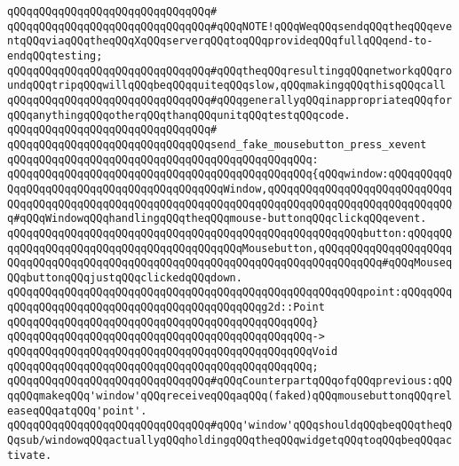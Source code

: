 \verb|qQQqqQQqqQQqqQQqqQQqqQQqqQQqqQQq#|\newline
\verb|qQQqqQQqqQQqqQQqqQQqqQQqqQQqqQQq#qQQqNOTE!qQQqWeqQQqsendqQQqtheqQQqeventqQQqviaqQQqtheqQQqXqQQqserverqQQqtoqQQqprovideqQQqfullqQQqend-to-endqQQqtesting;|\newline
\verb|qQQqqQQqqQQqqQQqqQQqqQQqqQQqqQQq#qQQqtheqQQqresultingqQQqnetworkqQQqroundqQQqtripqQQqwillqQQqbeqQQqquiteqQQqslow,qQQqmakingqQQqthisqQQqcall|\newline
\verb|qQQqqQQqqQQqqQQqqQQqqQQqqQQqqQQq#qQQqgenerallyqQQqinappropriateqQQqforqQQqanythingqQQqotherqQQqthanqQQqunitqQQqtestqQQqcode.|\newline
\verb|qQQqqQQqqQQqqQQqqQQqqQQqqQQqqQQq#|\newline
\verb|qQQqqQQqqQQqqQQqqQQqqQQqqQQqqQQqsend_fake_mousebutton_press_xevent|\newline
\verb|qQQqqQQqqQQqqQQqqQQqqQQqqQQqqQQqqQQqqQQqqQQqqQQq:|\newline
\verb|qQQqqQQqqQQqqQQqqQQqqQQqqQQqqQQqqQQqqQQqqQQqqQQq{qQQqwindow:qQQqqQQqqQQqqQQqqQQqqQQqqQQqqQQqqQQqqQQqqQQqWindow,qQQqqQQqqQQqqQQqqQQqqQQqqQQqqQQqqQQqqQQqqQQqqQQqqQQqqQQqqQQqqQQqqQQqqQQqqQQqqQQqqQQqqQQqqQQqqQQqqQQq#qQQqWindowqQQqhandlingqQQqtheqQQqmouse-buttonqQQqclickqQQqevent.|\newline
\verb|qQQqqQQqqQQqqQQqqQQqqQQqqQQqqQQqqQQqqQQqqQQqqQQqqQQqqQQqbutton:qQQqqQQqqQQqqQQqqQQqqQQqqQQqqQQqqQQqqQQqqQQqMousebutton,qQQqqQQqqQQqqQQqqQQqqQQqqQQqqQQqqQQqqQQqqQQqqQQqqQQqqQQqqQQqqQQqqQQqqQQqqQQqqQQq#qQQqMouseqQQqbuttonqQQqjustqQQqclickedqQQqdown.|\newline
\verb|qQQqqQQqqQQqqQQqqQQqqQQqqQQqqQQqqQQqqQQqqQQqqQQqqQQqqQQqpoint:qQQqqQQqqQQqqQQqqQQqqQQqqQQqqQQqqQQqqQQqqQQqqQQqg2d::Point|\newline
\verb|qQQqqQQqqQQqqQQqqQQqqQQqqQQqqQQqqQQqqQQqqQQqqQQq}|\newline
\verb|qQQqqQQqqQQqqQQqqQQqqQQqqQQqqQQqqQQqqQQqqQQqqQQq->|\newline
\verb|qQQqqQQqqQQqqQQqqQQqqQQqqQQqqQQqqQQqqQQqqQQqqQQqVoid|\newline
\verb|qQQqqQQqqQQqqQQqqQQqqQQqqQQqqQQqqQQqqQQqqQQqqQQq;|\newline
\newline
\verb|qQQqqQQqqQQqqQQqqQQqqQQqqQQqqQQq#qQQqCounterpartqQQqofqQQqprevious:qQQqqQQqmakeqQQq'window'qQQqreceiveqQQqaqQQq(faked)qQQqmousebuttonqQQqreleaseqQQqatqQQq'point'.|\newline
\verb|qQQqqQQqqQQqqQQqqQQqqQQqqQQqqQQq#qQQq'window'qQQqshouldqQQqbeqQQqtheqQQqsub/windowqQQqactuallyqQQqholdingqQQqtheqQQqwidgetqQQqtoqQQqbeqQQqactivate.|\newline
